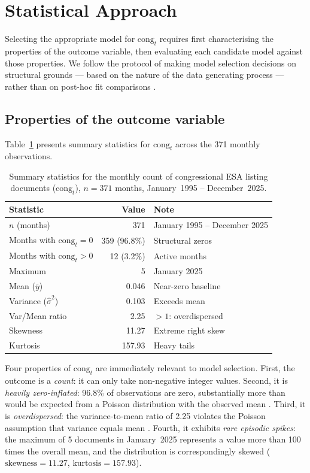 \documentclass[11pt]{article}
\begin{document}
\section{Statistical Approach}
Selecting the appropriate model for $\text{cong}_{t}$ requires first characterising the properties of the outcome variable, then evaluating each candidate model against those properties. We follow the protocol
of making model selection decisions on structural grounds --- based on the nature of the data generating process --- rather than on post-hoc fit comparisons \citep{Zuur2010, Gelman2007}.
 
\subsection{Properties of the outcome variable}
 
Table~\ref{tab:summary} presents summary statistics for
$\text{cong}_{t}$ across the 371 monthly observations.
 
\begin{table}[H]
  \centering
  \caption{Summary statistics for the monthly count of congressional
           ESA listing documents ($\text{cong}_{t}$),
           $n = 371$ months, January~1995 -- December~2025.}
  \label{tab:summary}
  \begin{tabular}{lrl}
    \toprule
    Statistic & Value & Note \\
    \midrule
    $n$ (months)           & 371    & January 1995 -- December 2025 \\
    Months with $\text{cong}_{t} = 0$ & 359 (96.8\%) & Structural zeros \\
    Months with $\text{cong}_{t} > 0$ & 12 (3.2\%)  & Active months \\
    Maximum                & 5      & January 2025 \\
    Mean ($\bar{y}$)       & 0.046  & Near-zero baseline \\
    Variance ($\hat{\sigma}^2$) & 0.103 & Exceeds mean \\
    Var/Mean ratio         & 2.25   & $> 1$: overdispersed \\
    Skewness               & 11.27  & Extreme right skew \\
    Kurtosis               & 157.93 & Heavy tails \\
    \bottomrule
  \end{tabular}
\end{table}
 
Four properties of $\text{cong}_{t}$ are immediately relevant to model
selection. First, the outcome is a \textit{count}: it can only take
non-negative integer values. Second, it is \textit{heavily zero-inflated}:
96.8\% of observations are zero, substantially more than would be expected
from a Poisson distribution with the observed mean
\citep{Welsh2000, Mullahy1986}. Third, it is \textit{overdispersed}: the
variance-to-mean ratio of 2.25 violates the Poisson assumption that
variance equals mean \citep{Cameron1998}. Fourth, it exhibits
\textit{rare episodic spikes}: the maximum of 5 documents in January~2025
represents a value more than 100 times the overall mean, and the
distribution is correspondingly skewed ($\text{skewness} = 11.27$,
$\text{kurtosis} = 157.93$).
 
\end{document}
